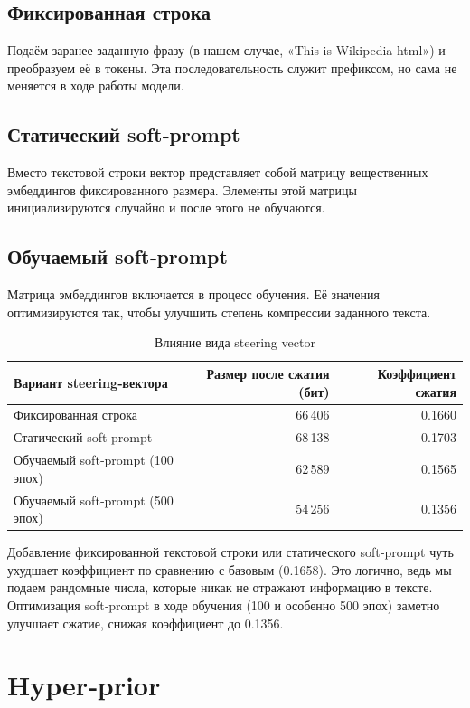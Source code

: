 \documentclass[a4paper,11pt]{article}
\begin{document}
\subsection*{Фиксированная строка}
Подаём заранее заданную фразу (в нашем случае, «This is Wikipedia html») и преобразуем её в токены. Эта последовательность служит префиксом, но сама не меняется в ходе работы модели.

\subsection*{Статический soft‑prompt}
Вместо текстовой строки вектор представляет собой матрицу вещественных эмбеддингов фиксированного размера. Элементы этой матрицы инициализируются случайно и после этого не обучаются.

\subsection*{Обучаемый soft‑prompt}
Матрица эмбеддингов включается в процесс обучения. Её значения оптимизируются так, чтобы улучшить степень компрессии заданного текста.

\begin{table}[ht]
\centering
\begin{tabular}{lrr}
\toprule
Вариант steering‑вектора         & Размер после сжатия (бит) & Коэффициент сжатия \\
\midrule
Фиксированная строка             & 66\,406                    & 0.1660             \\
Статический soft‑prompt          & 68\,138                    & 0.1703             \\
Обучаемый soft‑prompt (100 эпох) & 62\,589                    & 0.1565             \\
Обучаемый soft‑prompt (500 эпох) & 54\,256                    & 0.1356             \\
\bottomrule
\end{tabular}
\caption{Влияние вида steering vector}
\end{table}

Добавление фиксированной текстовой строки или статического soft‑prompt чуть ухудшает коэффициент по сравнению с базовым (0.1658). Это логично, ведь мы подаем рандомные числа, которые никак не отражают информацию в тексте.
Оптимизация soft‑prompt в ходе обучения (100 и особенно 500 эпох) заметно улучшает сжатие, снижая коэффициент до 0.1356.

\section*{Hyper‑prior}
\end{document}
